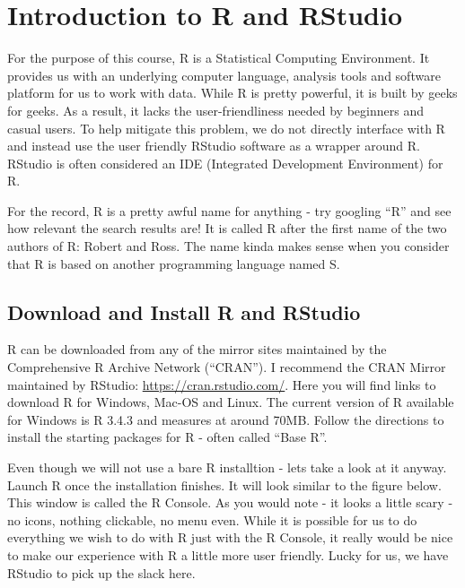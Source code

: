 \documentclass[]{krantz}
\theoremstyle{definition}
\theoremstyle{definition}
\theoremstyle{definition}
\theoremstyle{remark}
\begin{document}
\section{Introduction to R and
RStudio}\label{introduction-to-r-and-rstudio}

For the purpose of this course, R is a Statistical Computing
Environment. It provides us with an underlying computer language,
analysis tools and software platform for us to work with data. While R
is pretty powerful, it is built by geeks for geeks. As a result, it
lacks the user-friendliness needed by beginners and casual users. To
help mitigate this problem, we do not directly interface with R and
instead use the user friendly RStudio software as a wrapper around R.
RStudio is often considered an IDE (Integrated Development Environment)
for R.

For the record, R is a pretty awful name for anything - try googling
``R'' and see how relevant the search results are! It is called R after
the first name of the two authors of R: Robert and Ross. The name kinda
makes sense when you consider that R is based on another programming
language named S.

\subsection{Download and Install R and
RStudio}\label{download-and-install-r-and-rstudio}

R can be downloaded from any of the mirror sites maintained by the
Comprehensive R Archive Network (``CRAN''). I recommend the CRAN Mirror
maintained by RStudio: \url{https://cran.rstudio.com/}. Here you will
find links to download R for Windows, Mac-OS and Linux. The current
version of R available for Windows is R 3.4.3 and measures at around
70MB. Follow the directions to install the starting packages for R -
often called ``Base R''.

Even though we will not use a bare R installtion - lets take a look at
it anyway. Launch R once the installation finishes. It will look similar
to the figure below. This window is called the R Console. As you would
note - it looks a little scary - no icons, nothing clickable, no menu
even. While it is possible for us to do everything we wish to do with R
just with the R Console, it really would be nice to make our experience
with R a little more user friendly. Lucky for us, we have RStudio to
pick up the slack here.
\end{document}
